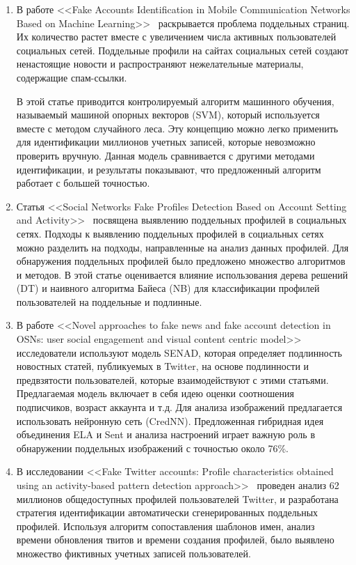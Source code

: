 \begin{enumerate}
    \item В работе <<Fake Accounts Identification in Mobile Communication 
    Networks Based on Machine Learning>>~\cite{HassanAA23} раскрывается проблема поддельных страниц. Их количество растет вместе с увеличением числа активных пользователей социальных сетей. Поддельные профили на сайтах социальных сетей создают ненастоящие новости и распространяют нежелательные материалы, содержащие спам-ссылки. 

    В этой статье приводится контролируемый алгоритм машинного обучения, называемый машиной опорных векторов (SVM), который используется вместе с методом случайного леса. Эту концепцию можно легко применить для идентификации миллионов учетных записей, которые невозможно проверить вручную. Данная модель сравнивается с другими методами идентификации, и результаты показывают, что предложенный алгоритм работает с большей точностью. 

    \item Статья <<Social Networks Fake Profiles Detection 
    Based on Account Setting and Activity>>~\cite{ElyusufiEK19} посвящена выявлению поддельных профилей в социальных сетях. Подходы к выявлению поддельных профилей в социальных сетях можно разделить на подходы, направленные на анализ данных профилей. Для обнаружения поддельных профилей было предложено множество алгоритмов и методов. В этой статье оценивается влияние использования дерева решений (DT) и наивного алгоритма Байеса (NB) для классификации профилей пользователей на поддельные и подлинные.

    \item В работе <<Novel approaches to fake news and fake account detection in OSNs: user social engagement and visual content centric model>>~\cite{UppadaMVHS22} исследователи используют модель SENAD, которая определяет подлинность новостных статей, публикуемых в Twitter, на основе подлинности и предвзятости пользователей, которые взаимодействуют с этими статьями. Предлагаемая модель включает в себя идею оценки соотношения подписчиков, возраст аккаунта и т.д. Для анализа изображений предлагается использовать нейронную сеть (CredNN). Предложенная гибридная идея объединения ELA и Sent и анализа настроений играет важную роль в обнаружении поддельных изображений с точностью около 76\%.
    
    \item В исследовании <<Fake Twitter accounts: Profile characteristics obtained using an activity-based pattern detection approach>>~\cite{GurajalaWHM15} проведен анализ 62 миллионов общедоступных профилей пользователей Twitter, и разработана стратегия идентификации автоматически сгенерированных поддельных профилей. Используя алгоритм сопоставления шаблонов имен, анализ времени обновления твитов и времени создания профилей, было выявлено множество фиктивных учетных записей пользователей.
\end{enumerate}

